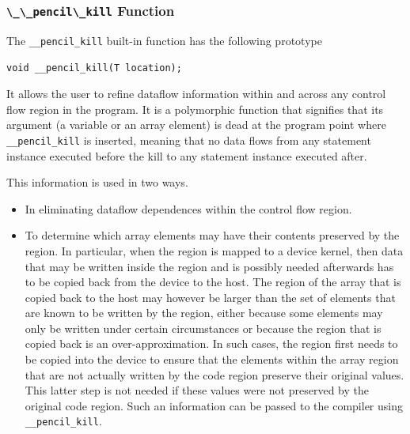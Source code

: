 \subsubsection{\label{sec:kill}\lstinline!\_\_pencil\_kill! Function}
  
The \lstinline!__pencil_kill! built-in function has the following prototype

  \lstinline!void __pencil_kill(T location);!

  It allows the user to refine dataflow information
  within and across any control flow region in the program.
  It is a polymorphic function that signifies that its argument
  (a variable or an array element) is dead at the program point
  where \lstinline!__pencil_kill! is inserted, meaning that no data
  flows from any statement instance executed before the kill to any
  statement instance executed after.

  This information is used in two ways.
  \begin{itemize}
   \item In eliminating dataflow dependences within the control
         flow region.
   \item To determine which array elements may have their contents
         preserved by the region.
         In particular, when the region is mapped to a device kernel, then
         data that may be written inside the region and is possibly needed
         afterwards has to be copied back from the device to the host.
         The region of the array that is copied back to the host may
         however be larger than the set of elements that are known
         to be written by the region, either because some elements
         may only be written under certain circumstances or because
         the region that is copied back is an over-approximation.
         In such cases, the region first needs to be copied into the device
         to ensure that the elements within the array region that are not
         actually written by the code region preserve their original values.
         This latter step is not needed if these values were not preserved
         by the original code region.  Such an information can be passed to
         the compiler using \lstinline!__pencil_kill!.
  \end{itemize}

